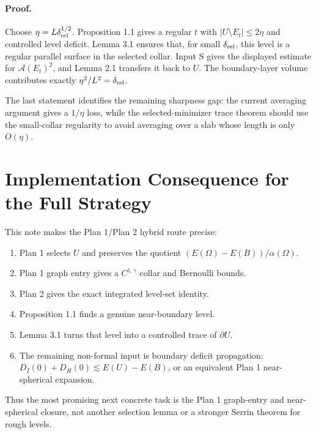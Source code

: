 \documentclass[11pt]{article}
\begin{document}
\paragraph{Proof.}
Choose \(\eta=L\delta_{\rm rel}^{1/2}\). Proposition 1.1 gives a regular
\(t\) with \(|U\setminus E_t|\le 2\eta\) and controlled level deficit. Lemma
3.1 ensures that, for small \(\delta_{\rm rel}\), this level is a regular
parallel surface in the selected collar. Input S gives the displayed estimate
for \(\mathcal A(E_t)^2\), and Lemma 2.1 transfers it back to \(U\). The
boundary-layer volume contributes exactly \(\eta^2/L^2=\delta_{\rm rel}\).

The last statement identifies the remaining sharpness gap: the current
averaging argument gives a \(1/\eta\) loss, while the selected-minimizer trace
theorem should use the small-collar regularity to avoid averaging over a slab
whose length is only \(O(\eta)\).

\section{Implementation Consequence for the Full Strategy}

This note makes the Plan 1/Plan 2 hybrid route precise:
\begin{enumerate}
\item Plan 1 selects \(U\) and preserves the quotient
\((E(\Omega)-E(B))/\alpha(\Omega)\).
\item Plan 1 graph entry gives a \(C^{1,\gamma}\) collar and Bernoulli bounds.
\item Plan 2 gives the exact integrated level-set identity.
\item Proposition 1.1 finds a genuine near-boundary level.
\item Lemma 3.1 turns that level into a controlled trace of \(\partial U\).
\item The remaining non-formal input is boundary deficit propagation:
\(D_I(0)+D_H(0)\lesssim E(U)-E(B)\), or an equivalent Plan 1 near-spherical
expansion.
\end{enumerate}
Thus the most promising next concrete task is the Plan 1 graph-entry and
near-spherical closure, not another selection lemma or a stronger Serrin theorem
for rough levels.
\end{document}
